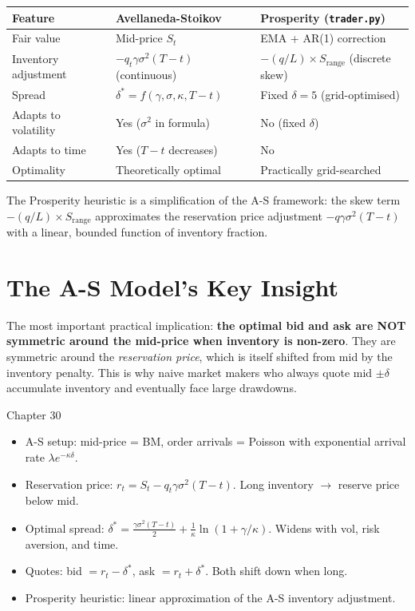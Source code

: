 \documentclass[12pt,a4paper,openany]{report}
\theoremstyle{definition}
\begin{document}
\begin{center}
\begin{tabular}{lll}
\toprule
\textbf{Feature} & \textbf{Avellaneda-Stoikov} & \textbf{Prosperity (\texttt{trader.py})} \\
\midrule
Fair value & Mid-price $S_t$ & EMA + AR(1) correction \\
Inventory adjustment & $-q_t\gamma\sigma^2(T-t)$ (continuous) & $-(q/L)\times S_{\text{range}}$ (discrete skew) \\
Spread & $\delta^* = f(\gamma, \sigma, \kappa, T-t)$ & Fixed $\delta = 5$ (grid-optimised) \\
Adapts to volatility & Yes ($\sigma^2$ in formula) & No (fixed $\delta$) \\
Adapts to time & Yes ($T-t$ decreases) & No \\
Optimality & Theoretically optimal & Practically grid-searched \\
\bottomrule
\end{tabular}
\end{center}

The Prosperity heuristic is a simplification of the A-S framework: the skew term $-(q/L)\times S_{\text{range}}$ approximates the reservation price adjustment $-q\gamma\sigma^2(T-t)$ with a linear, bounded function of inventory fraction.

\section{The A-S Model's Key Insight}

The most important practical implication: \textbf{the optimal bid and ask are NOT symmetric around the mid-price when inventory is non-zero}. They are symmetric around the \emph{reservation price}, which is itself shifted from mid by the inventory penalty. This is why naive market makers who always quote mid $\pm \delta$ accumulate inventory and eventually face large drawdowns.

\begin{takeawaybox}{Chapter 30}
\begin{itemize}
  \item A-S setup: mid-price = BM, order arrivals = Poisson with exponential arrival rate $\lambda e^{-\kappa\delta}$.
  \item Reservation price: $r_t = S_t - q_t\gamma\sigma^2(T-t)$. Long inventory $\to$ reserve price below mid.
  \item Optimal spread: $\delta^* = \frac{\gamma\sigma^2(T-t)}{2} + \frac{1}{\kappa}\ln(1+\gamma/\kappa)$. Widens with vol, risk aversion, and time.
  \item Quotes: bid $= r_t - \delta^*$, ask $= r_t + \delta^*$. Both shift down when long.
  \item Prosperity heuristic: linear approximation of the A-S inventory adjustment.
\end{itemize}
\end{takeawaybox}
\end{document}
